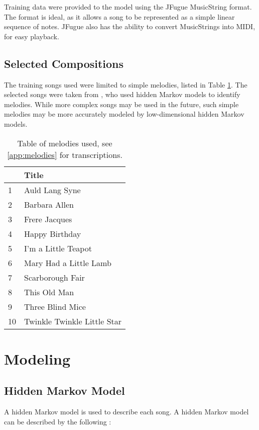 \documentclass[12pt]{article}
\begin{document}
Training data were provided to the model using the JFugue \parencite{jfugue4}
MusicString format. The format is ideal, as it allows a song to be represented
as a simple linear sequence of notes. JFugue also has the ability to convert
MusicStrings into MIDI, for easy playback.


\subsection{Selected Compositions}

The training songs used were limited to simple melodies, listed in Table
\ref{tab:melodies}. The selected songs were taken from \textcite{durey2001},
who used hidden Markov models to identify melodies. While more complex songs
may be used in the future, such simple melodies may be more accurately modeled
by low-dimensional hidden Markov models.

\begin{table}[t]
\centering
\begin{tabular}{l|l}
& Title
\\\hline\hline
1 & Auld Lang Syne
\\
2 & Barbara Allen
\\
3 & Frere Jacques
\\
4 & Happy Birthday
\\
5 & I'm a Little Teapot
\\
6 & Mary Had a Little Lamb
\\
7 & Scarborough Fair
\\
8 & This Old Man
\\
9 & Three Blind Mice
\\
10 & Twinkle Twinkle Little Star
\end{tabular}
\caption{Table of melodies used, see \ref{app:melodies} for transcriptions.}
\label{tab:melodies}
\end{table}


\section{Modeling}

\subsection{Hidden Markov Model}
\label{sec:hmm}

A hidden Markov model is used to describe each song. A hidden Markov model can
be described by the following \parencite{rabiner1989}:
\end{document}
